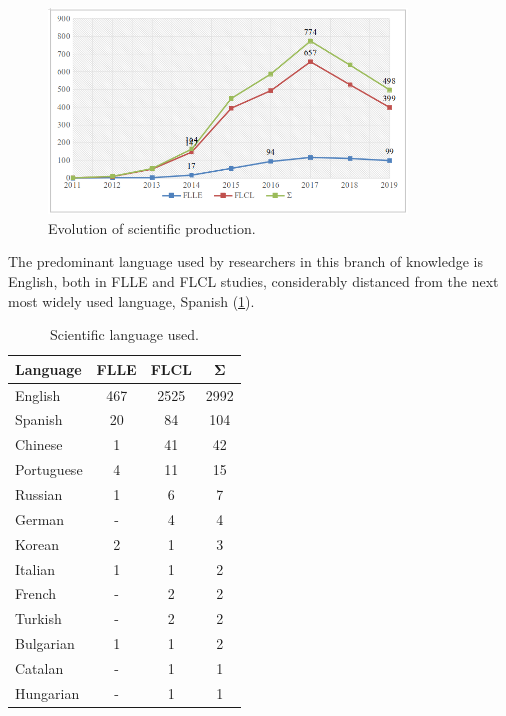 \documentclass{textolivre}
\begin{document}
\begin{figure}[htbp]
 \centering
 \includegraphics[width=0.85\textwidth]{Fig01.png}
 \caption{Evolution of scientific production.}
 \label{Fig01}
\end{figure}

The predominant language used by researchers in this branch of knowledge is English, both in FLLE and FLCL studies, considerably distanced from the next most widely used language, Spanish (\cref{tbl-tabela-04}).


\begin{table}[htpb]
\caption{Scientific language used.}
\label{tbl-tabela-04}
\centering
\begin{tabular}{lccc}
\toprule
\textbf{Language} & \textbf{FLLE} & \textbf{FLCL} & \textbf{Σ} \\ 
\midrule
English    & 467 & 2525 & 2992 \\ 
Spanish    & 20  & 84   & 104  \\ 
Chinese    & 1   & 41   & 42   \\ 
Portuguese & 4   & 11   & 15   \\ 
Russian    & 1   & 6    & 7    \\ 
German     & -   & 4    & 4    \\ 
Korean     & 2   & 1    & 3    \\ 
Italian    & 1   & 1    & 2    \\ 
French     & -   & 2    & 2    \\ 
Turkish    & -   & 2    & 2    \\ 
Bulgarian  & 1   & 1    & 2    \\ 
Catalan    & -   & 1    & 1    \\ 
Hungarian  & -   & 1    & 1    \\ 
\bottomrule
\end{tabular}
\end{table}
\end{document}
